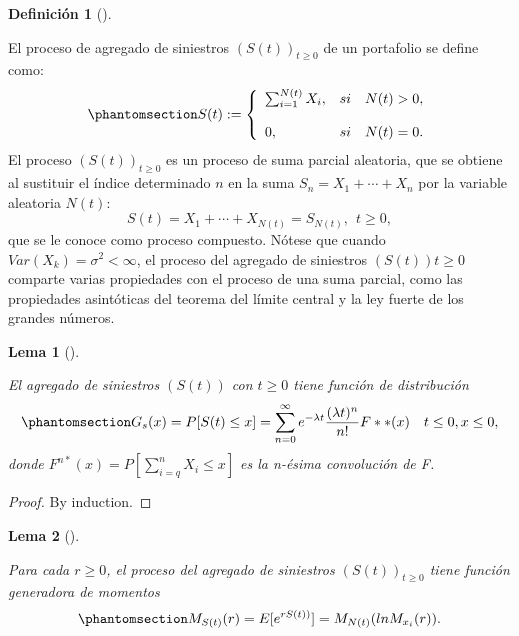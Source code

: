 \documentclass[
  us-letterpaper,
]{scrreprt}
\theoremstyle{definition}
\newtheorem{definition}{Definición}[chapter]
\theoremstyle{plain}
\newtheorem{lemma}{Lema}[chapter]
\theoremstyle{plain}
\theoremstyle{remark}
\begin{document}
\begin{definition}[]\protect\hypertarget{def-2}{}\label{def-2}

El proceso de agregado de siniestros \((S(t))_{t \geq 0}\) de un
portafolio se define como:
\begin{equation}\phantomsection\label{eq-1.2}{S(t):= \left\{ \begin{array}{lcc} \sum_{i=1}^{N(t)} X_i, & si & N(t) > 0, \\ \\ 
0, & si & N(t) = 0. \end{array} \right. }\end{equation} El proceso
\((S(t))_{t\geq0}\) es un proceso de suma parcial aleatoria, que se
obtiene al sustituir el índice determinado \(n\) en la suma
\(S_n = X_1 + \dotsb + X_n\) por la variable aleatoria \(N(t):\)
\[S(t) = X_1 + \dotsb+ X_{N(t)} = S_{N(t)}, \ \ t\geq0,\]que se le
conoce como proceso compuesto. Nótese que cuando
\(Var(X_k) = \sigma^2 < \infty\), el proceso del agregado de siniestros
\((S(t))t\ge0\) comparte varias propiedades con el proceso de una suma
parcial, como las propiedades asintóticas del teorema del límite central
y la ley fuerte de los grandes números.

\end{definition}

\begin{lemma}[]\protect\hypertarget{lem-1}{}\label{lem-1}

El agregado de siniestros \((S(t))\) con \(t \geq 0\) tiene función de
distribución
\begin{equation}\phantomsection\label{eq-1.3}{G_s(x) = P[S(t) \leq x] = \sum_{n=0}^{\infty} e^{-\lambda t}\frac{(\lambda t)^n}{n!}F**(x) \ \ \ t\leq 0, x \leq 0,}\end{equation}
donde \(F^{n*}(x)= P[\sum_{i=q}^{n} X_i \leq x]\) es la n-ésima
convolución de F.

\end{lemma}

\begin{proof}
By induction.
\end{proof}

\begin{lemma}[]\protect\hypertarget{lem-2}{}\label{lem-2}

Para cada \(r \geq 0\), el proceso del agregado de siniestros
\((S(t))_{t \geq 0}\) tiene función generadora de momentos
\begin{equation}\phantomsection\label{eq-1.5}{M_{S(t)}(r) = E[e^{rS(t))}] = M_{N(t)}(ln M_{x_i}(r)).}\end{equation}

\end{lemma}
\end{document}
